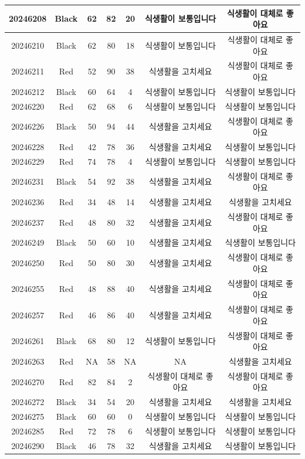 \documentclass[
]{book}
\begin{document}
\begin{tabular}{c|c|c|c|c|c|c}
\hline
20246208 & Black & 62 & 82 & 20 & 식생활이 보통입니다 & 식생활이 대체로 좋아요\\
\hline
20246210 & Black & 62 & 80 & 18 & 식생활이 보통입니다 & 식생활이 대체로 좋아요\\
\hline
20246211 & Red & 52 & 90 & 38 & 식생활을 고치세요 & 식생활이 대체로 좋아요\\
\hline
20246212 & Black & 60 & 64 & 4 & 식생활이 보통입니다 & 식생활이 보통입니다\\
\hline
20246220 & Red & 62 & 68 & 6 & 식생활이 보통입니다 & 식생활이 보통입니다\\
\hline
20246226 & Black & 50 & 94 & 44 & 식생활을 고치세요 & 식생활이 대체로 좋아요\\
\hline
20246228 & Red & 42 & 78 & 36 & 식생활을 고치세요 & 식생활이 보통입니다\\
\hline
20246229 & Red & 74 & 78 & 4 & 식생활이 보통입니다 & 식생활이 보통입니다\\
\hline
20246231 & Black & 54 & 92 & 38 & 식생활을 고치세요 & 식생활이 대체로 좋아요\\
\hline
20246236 & Red & 34 & 48 & 14 & 식생활을 고치세요 & 식생활을 고치세요\\
\hline
20246237 & Red & 48 & 80 & 32 & 식생활을 고치세요 & 식생활이 대체로 좋아요\\
\hline
20246249 & Black & 50 & 60 & 10 & 식생활을 고치세요 & 식생활이 보통입니다\\
\hline
20246250 & Red & 50 & 80 & 30 & 식생활을 고치세요 & 식생활이 대체로 좋아요\\
\hline
20246255 & Red & 48 & 88 & 40 & 식생활을 고치세요 & 식생활이 대체로 좋아요\\
\hline
20246257 & Red & 46 & 86 & 40 & 식생활을 고치세요 & 식생활이 대체로 좋아요\\
\hline
20246261 & Black & 68 & 80 & 12 & 식생활이 보통입니다 & 식생활이 대체로 좋아요\\
\hline
20246263 & Red & NA & 58 & NA & NA & 식생활을 고치세요\\
\hline
20246270 & Red & 82 & 84 & 2 & 식생활이 대체로 좋아요 & 식생활이 대체로 좋아요\\
\hline
20246272 & Black & 34 & 54 & 20 & 식생활을 고치세요 & 식생활을 고치세요\\
\hline
20246275 & Black & 60 & 60 & 0 & 식생활이 보통입니다 & 식생활이 보통입니다\\
\hline
20246285 & Red & 72 & 78 & 6 & 식생활이 보통입니다 & 식생활이 보통입니다\\
\hline
20246290 & Black & 46 & 78 & 32 & 식생활을 고치세요 & 식생활이 보통입니다\\

\end{tabular}
\end{document}
